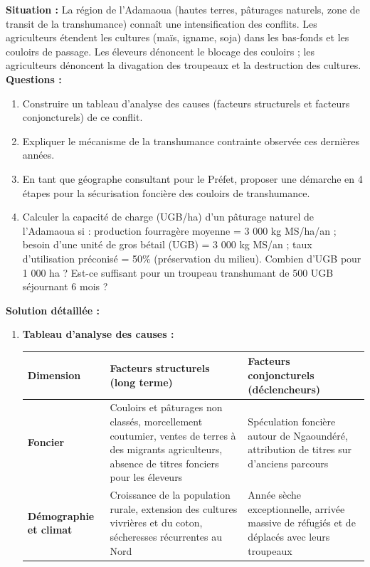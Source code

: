 \documentclass[11pt]{article}
\begin{document}
\begin{exoresolu}
\textbf{Situation :} La région de l'Adamaoua (hautes terres, pâturages naturels, zone de transit de la transhumance) connaît une intensification des conflits. Les agriculteurs étendent les cultures (maïs, igname, soja) dans les bas-fonds et les couloirs de passage. Les éleveurs dénoncent le blocage des couloirs ; les agriculteurs dénoncent la divagation des troupeaux et la destruction des cultures.
\textbf{Questions :}
\begin{enumerate}
    \item Construire un tableau d'analyse des causes (facteurs structurels et facteurs conjoncturels) de ce conflit.
    \item Expliquer le mécanisme de la \og transhumance contrainte \fg{} observée ces dernières années.
    \item En tant que géographe consultant pour le Préfet, proposer une démarche en 4 étapes pour la sécurisation foncière des couloirs de transhumance.
    \item Calculer la capacité de charge (UGB/ha) d'un pâturage naturel de l'Adamaoua si : production fourragère moyenne = 3 000 kg MS/ha/an ; besoin d'une unité de gros bétail (UGB) = 3 000 kg MS/an ; taux d'utilisation préconisé = 50\% (préservation du milieu). Combien d'UGB pour 1 000 ha ? Est-ce suffisant pour un troupeau transhumant de 500 UGB séjournant 6 mois ?
\end{enumerate}
\tcblower
\textbf{Solution détaillée :}
\begin{enumerate}
    \item \textbf{Tableau d'analyse des causes :}
    \begin{center}
    \begin{tabularx}{\linewidth}{|l|X|X|}\hline
    \textbf{Dimension} & \textbf{Facteurs structurels (long terme)} & \textbf{Facteurs conjoncturels (déclencheurs)} \\ \hline
    \textbf{Foncier} & Couloirs et pâturages non classés, morcellement coutumier, ventes de terres à des migrants agriculteurs, absence de titres fonciers pour les éleveurs & Spéculation foncière autour de Ngaoundéré, attribution de titres sur d'anciens parcours \\ \hline
    \textbf{Démographie et climat} & Croissance de la population rurale, extension des cultures vivrières et du coton, sécheresses récurrentes au Nord & Année sèche exceptionnelle, arrivée massive de réfugiés et de déplacés avec leurs troupeaux \\ \hline

\end{tabularx}
\end{center}
\end{enumerate}
\end{exoresolu}
\end{document}
